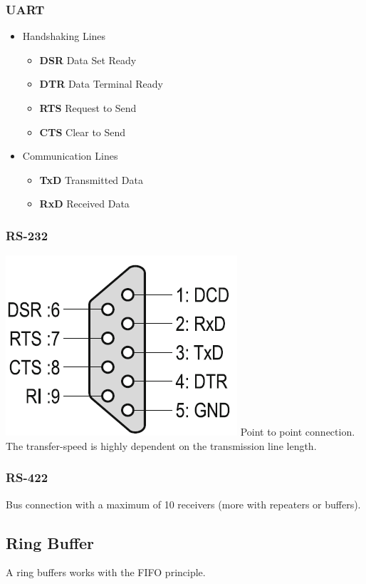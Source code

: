 \subsubsection{UART}
\begin{itemize}
	\itemsep-.5em
	\item Handshaking Lines
	\begin{itemize}
		\itemsep-.5em 
		\item \textbf{DSR} Data Set Ready
		\item \textbf{DTR} Data Terminal Ready
		\item \textbf{RTS} Request to Send
		\item \textbf{CTS} Clear to Send
	\end{itemize}
	\item Communication Lines
	\begin{itemize}
		\itemsep-.5em
		\item \textbf{TxD} Transmitted Data
		\item \textbf{RxD} Received Data
	\end{itemize}
\end{itemize}

\subsubsection{RS-232 }
\includegraphics[width=.4\columnwidth]{"Images/RS232Connector.png"}
Point to point connection.
The transfer-speed is highly dependent on the transmission line length.

\subsubsection{RS-422}
Bus connection with a maximum of 10 receivers (more with repeaters or buffers).

\subsection{Ring Buffer}
A ring buffers works with the FIFO principle.